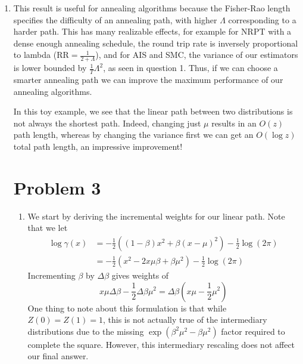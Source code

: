 \documentclass{article}
\begin{document}
\begin{enumerate}
    \begin{itemize}
        \item $\Lambda_1 = \sqrt{2}\left|\log \frac{z}{\sigma}\right|$
        \item $\Lambda_2 = \frac{|\mu_1 - \mu_0|}{\sigma'} = 1$
        \item $\Lambda_3 = \sqrt{2}\left|\log \frac{z}{\sigma}\right|$
    \end{itemize}
    The total length is $\Lambda = \Lambda_1 + \Lambda_2 + \Lambda_3 = 2\sqrt{2}\left|\log \frac{z}{\sigma}\right| + 1$
    which is $O(\log z)$ as desired.
    \item %
    This result is useful for annealing algorithms because the Fisher-Rao length
    specifies the difficulty of an annealing path, with higher $\Lambda$
    corresponding to a harder path. This has many realizable effects, for
    example for NRPT with a dense enough annealing schedule, the round trip rate
    is inversely proportional to lambda ($\text{RR} = \frac{1}{2 + \Lambda}$),
    and for AIS and SMC, the variance of our estimators is lower bounded by
    $\frac 1 T \Lambda^2$, as seen in question 1. Thus, if we can choose a smarter annealing
    path we can improve the maximum performance of our annealing algorithms.

    In this toy example, we see that the linear path between two
    distributions is not always the shortest path. Indeed, changing just
    $\mu$ results in an $O(z)$ path length, whereas by changing the variance
    first we can get an $O(\log z)$ total path length, an impressive improvement!
\section{Problem 3}
\begin{enumerate}
    \item %
    We start by deriving the incremental weights for our linear path. Note that
    we let
    \begin{align}
        \log \gamma(x) &=
            -\frac 1 2 \left((1-\beta)x^2 + \beta (x - \mu) ^2 \right) 
            - \frac 1 2 \log(2\pi) \\
            &= -\frac 1 2 \left( x^2 - 2x\mu\beta + \beta\mu^2\right)
            - \frac 1 2 \log(2\pi)
    \end{align}
    Incrementing $\beta$ by $\Delta\beta$ gives weights of 
    \[
        x\mu\Delta\beta - \frac 1 2 \Delta\beta \mu^2 = 
            \Delta\beta \left(x\mu - \frac 1 2 \mu^2 \right)
    \]
    One thing to note about this formulation is that while $Z(0) = Z(1) = 1$,
    this is not actually true of the intermediary distributions due to the 
    missing $\exp\left(\beta^2 \mu^2 - \beta \mu^2\right)$ factor required to
    complete the square. However, this intermediary rescaling does not affect
    our final answer.


\end{enumerate}
\end{enumerate}
\end{document}
